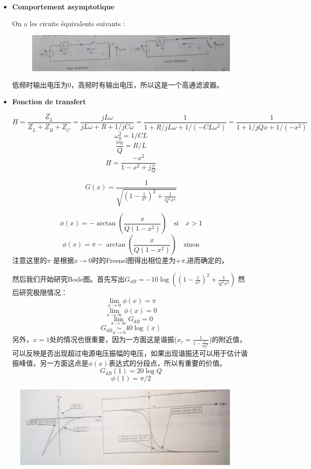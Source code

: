 \documentclass[12pt]{book}
\theoremstyle{definition}\newtheorem{dfn}{Définition}[chapter]
\theoremstyle{plain}\newtheorem{thm}{Théorème}[chapter]
\theoremstyle{plain}\newtheorem{prp}{Proposition}[chapter]
\theoremstyle{plain}\newtheorem{lem}{\bf Lemme}[chapter]
\theoremstyle{plain}\newtheorem{axm}{\bf Axiome}[chapter]
\theoremstyle{plain}\newtheorem{lmm}{\bf Lemme}[chapter]
\theoremstyle{plain}\newtheorem{cor}{\bf Corollaire}[chapter]
\theoremstyle{remark}\newtheorem{rem}{Remarque}[chapter]
\begin{document}
\begin{itemize}
	\item \textbf{Comportement asymptotique}
	
	On a les ciruits équivalents suivants :
\begin{figure}[H]
	\centering
	\includegraphics[scale=0.16]{image//Filtrage//6}
\end{figure}
低频时输出电压为0，高频时有输出电压，所以这是一个高通滤波器。

\item \textbf{Fonction de transfert}

$$
\underline{H}=\frac{\underline{Z}_L}{\underline{Z}_L+\underline{Z}_R+\underline{Z}_C}=\frac{jL\omega}{jL\omega+R+1/jC\omega}=\frac{1}{1+R/jL\omega+1/(-CL\omega^2)}=\frac{1}{1+1/jQx+1/(-x^2)}
$$
$$
\omega_0^2=1/CL
$$
$$
\frac{\omega_0}{Q}=R/L
$$
$$
\boxed{\underline{H}=\frac{-x^2}{1-x^2+j\frac{x}{Q}}}
$$

$$
G(x)=\frac{1}{\sqrt{(1-\frac{1}{x^2})^2+\frac{1}{Q^2x^2}}}
$$

$$
\phi(x)=-\arctan(\frac{x}{Q(1-x^2)})\quad \text{si}\quad x>1
$$
$$
\phi(x)=\pi-\arctan(\frac{x}{Q(1-x^2)})\quad \text{sinon}
$$
注意这里的$\pi$ 是根据$x\to0$时的Fresnel图得出相位差为$+\pi$,进而确定的。

然后我们开始研究Bode图。首先写出$G_{dB}=-10\log((1-\frac{1}{x^2})^2+\frac{1}{Q^2x^2})$
然后研究极限情况：
$$
\lim\limits_{x\to0}\phi(x)=\pi
$$
$$
\lim\limits_{x\to\infty}\phi(x)=0
$$
$$
\lim\limits_{x\to\infty}G_{dB}=0
$$
$$
G_{dB}\underset{x\to0}{\sim}40\log(x)
$$
另外，$x=1$处的情况也很重要，因为一方面这是谐振($x_r=\frac{1}{1-\frac{1}{2Q^2}}$)的附近值，可以反映是否出现超过电源电压振幅的电压，如果出现谐振还可以用于估计谐振峰值，另一方面这点是$\phi(x)$表达式的分段点，所以有重要的价值。
$$
G_{dB}(1)=20\log Q
$$
$$
\phi(1)=\pi/2
$$
\end{itemize}

\begin{figure}[H]
	\centering
	\includegraphics[scale=0.15]{image//Filtrage//7}
\end{figure}
\end{document}
